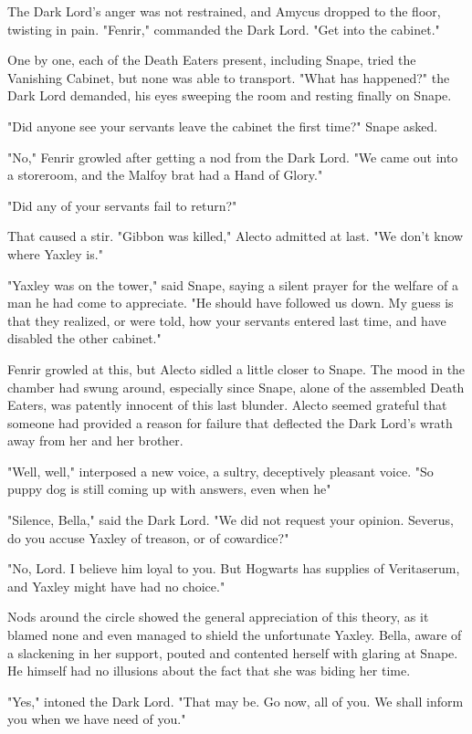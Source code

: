 The Dark Lord's anger was not restrained, and Amycus dropped to the floor, twisting in pain. "Fenrir," commanded the Dark Lord. "Get into the cabinet."

One by one, each of the Death Eaters present, including Snape, tried the Vanishing Cabinet, but none was able to transport. "What has happened?" the Dark Lord demanded, his eyes sweeping the room and resting finally on Snape.

"Did anyone see your servants leave the cabinet the first time?" Snape asked.

"No," Fenrir growled after getting a nod from the Dark Lord. "We came out into a storeroom, and the Malfoy brat had a Hand of Glory."

"Did any of your servants fail to return?"

That caused a stir. "Gibbon was killed," Alecto admitted at last. "We don't know where Yaxley is."

"Yaxley was on the tower," said Snape, saying a silent prayer for the welfare of a man he had come to appreciate. "He should have followed us down. My guess is that they realized, or were told, how your servants entered last time, and have disabled the other cabinet."

Fenrir growled at this, but Alecto sidled a little closer to Snape. The mood in the chamber had swung around, especially since Snape, alone of the assembled Death Eaters, was patently innocent of this last blunder. Alecto seemed grateful that someone had provided a reason for failure that deflected the Dark Lord's wrath away from her and her brother.

"Well, well," interposed a new voice, a sultry, deceptively pleasant voice. "So puppy dog is still coming up with answers, even when he{\el}"

"Silence, Bella," said the Dark Lord. "We did not request your opinion. Severus, do you accuse Yaxley of treason, or of cowardice?"

"No, Lord. I believe him loyal to you. But Hogwarts has supplies of Veritaserum, and Yaxley might have had no choice."

Nods around the circle showed the general appreciation of this theory, as it blamed none and even managed to shield the unfortunate Yaxley. Bella, aware of a slackening in her support, pouted and contented herself with glaring at Snape. He himself had no illusions about the fact that she was biding her time.

"Yes," intoned the Dark Lord. "That may be. Go now, all of you. We shall inform you when we have need of you."

